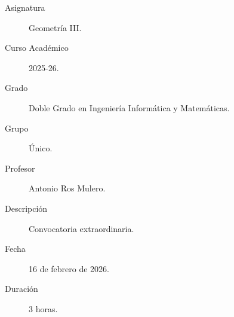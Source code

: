 \documentclass[12pt]{article}
\begin{document}

    
    

    \begin{description}
        \item[Asignatura] Geometría III.
        \item[Curso Académico] 2025-26.
        \item[Grado] Doble Grado en Ingeniería Informática y Matemáticas.
        \item[Grupo] Único.
        \item[Profesor] Antonio Ros Mulero.
        \item[Descripción] Convocatoria extraordinaria.
        \item[Fecha] 16 de febrero de 2026.
        \item[Duración] 3 horas.
    \end{description}
    \newpage
    
\end{document}
